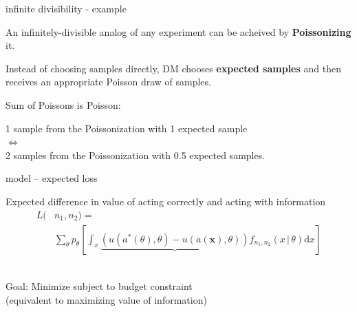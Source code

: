 \documentclass[square,]{gBakerBeamer}
\renewcommand{\|}{\,|\,}
\newcommand{\D}{\mathrm{d}}
\begin{document}
\begin{frame}{infinite divisibility - example}

  An infinitely-divisible analog of any experiment can be acheived by \textbf{Poissonizing} it.\bigskip

  Instead of choosing samples directly, DM chooses \textbf{expected samples} and then receives an appropriate Poisson draw of samples.\pause\bigskip

  Sum of Poissons is Poisson:\\
  \begin{center}
    1 sample from the Poissonization with 1 expected sample\\
    $\Leftrightarrow$\\
    2 samples from the Poissonization with 0.5 expected samples.
  \end{center}
  \note{%

  }
\end{frame}



\begin{frame}{model -- expected loss}

  Expected difference in value of acting correctly and acting with information
  \begin{align*}
    L(&n_1, n_2) = \\
      & \sum_{\theta}p_{\theta}
        \left[ \int_{x} \underbrace{
        \left( u(a^{*}(\theta), \theta) - u(a(\mathbf{x}), \theta) \right)
        }
        f_{n_1, n_2}(x\|\theta)\D x
        \right]
  \end{align*}
  \hspace{4em}{\small cost of choosing $a(x)$ when $a(\theta)$ optimal}\\[2em]\pause

  \alert{Goal: Minimize subject to budget constraint}\\
  {\small\hspace{1em}(equivalent to maximizing value of information)}
\end{frame}
\end{document}
